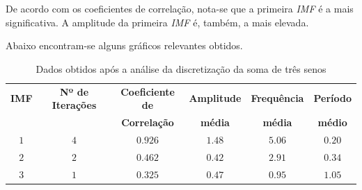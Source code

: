 \documentclass[letterpaper]{article}
\begin{document}
\begin{multicols}{2}
\par De acordo com os coeficientes de correlação, nota-se que a primeira \textit{IMF} é a mais significativa. A amplitude da primeira \textit{IMF} é, também, a mais elevada.
\par Abaixo encontram-se alguns gráficos relevantes obtidos.

\end{multicols}

\begin{table}[b!]
\centering
\begin{tabular}{c c c c c c}
\hline
\textbf{IMF} & \textbf{Nº de Iterações} & \textbf{Coeficiente de} & \textbf{Amplitude} & \textbf{Frequência} & \textbf{Período}\\
 &  & \textbf{Correlação} & \textbf{média} & \textbf{média} & \textbf{médio}\\
\hline
$1$ & $4$ & $0.926$ & $1.48$ & $5.06$ & $0.20$\\
$2$ & $2$ & $0.462$ & $0.42$ & $2.91$ & $0.34$\\
$3$ & $1$ & $0.325$ & $0.47$ & $0.95$ & $1.05$\\
\hline
\end{tabular}
\caption{Dados obtidos após a análise da discretização da soma de três senos}
\end{table}
\end{document}
